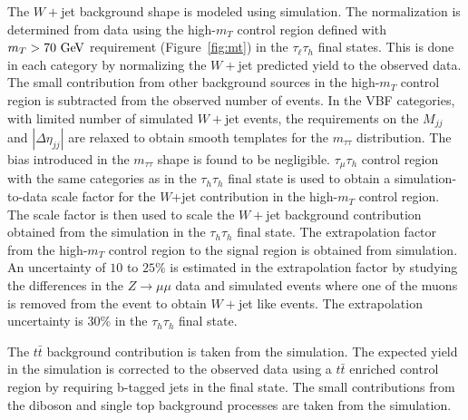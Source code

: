 The $W+$jet background shape is modeled using simulation. The normalization is determined from data using the high-$m_T$ control region defined with $m_{T}>70~\mathrm{Ge\kern -0.1em V}$ requirement (Figure~\ref{fig:mt}) in the $\tau_{\ell}\tau_h$ final states. This is done in each category by normalizing the $W+$jet predicted yield to the observed data. The small contribution from other background sources in the high-$m_T$ control region is subtracted from the observed number of events. In the VBF categories, with limited number of simulated $W+$jet events, the requirements on the $M_{jj}$ and $|\Delta \eta_{jj}|$ are relaxed to obtain smooth templates for the $m_{\tau\tau}$ distribution. The bias introduced in the $m_{\tau\tau}$ shape is found to be negligible. $\tau_{\mu}\tau_h$ control region with the same categories as in the $\tau_h\tau_h$ final state is used to obtain a simulation-to-data scale factor for the $W$+jet contribution in the high-$m_T$ control region. The scale factor is then used to scale the $W+$jet background contribution obtained from the simulation in the $\tau_h\tau_h$ final state. The extrapolation factor from the high-$m_{T}$ control region to the signal region is obtained from simulation. An uncertainty of $10$ to $25\%$ is estimated in the extrapolation factor by studying the differences in the $Z\rightarrow \mu\mu$ data and simulated events where one of the muons is removed from the event to obtain $W+$jet like events. The extrapolation uncertainty is $30\%$ in the $\tau_h\tau_h$ final state.

The $t\bar{t}$ background contribution is taken from the simulation. The expected yield in the simulation is corrected to the observed data using a $t\bar{t}$ enriched control region by requiring b-tagged jets in the final state. The small contributions from the diboson and single top background processes  are taken from the simulation. 

